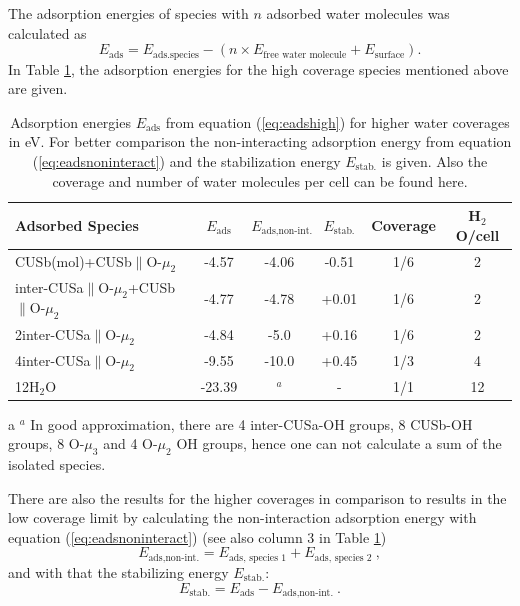 \documentclass[11pt,DIV=13,BCOR=5mm,a4paper,headinclude]{scrbook}
\begin{document}
The adsorption energies of species with $n$ adsorbed water molecules was calculated as
\begin{equation}\label{eq:eadshigh}
 E_\textrm{ads}=E_\textrm{ads.species}-(n\times E_\text{free water molecule}+E_\text{surface}).
\end{equation}
In Table \ref{tab:higher_water}, the adsorption energies for the high coverage species mentioned above are given.
\begin{table}[!ht]
  \centering
 \caption{Adsorption energies $E_\textrm{ads}$ from equation (\ref{eq:eadshigh}) for higher water coverages in eV.
For better comparison the non-interacting adsorption energy from equation (\ref{eq:eadsnoninteract}) and the stabilization energy $E_\textrm{stab.}$ is given.
Also the coverage and number of water molecules per cell can be found here.
\vspace*{.2cm} 
  }
  \begin{tabular}{lccccc}
  \toprule
  Adsorbed Species  & $E_\textrm{ads}$ & $E_\textrm{ads,non-int.}$& $E_\textrm{stab.}$& Coverage &H$_2$O/cell\\\midrule
   CUSb(mol)+CUSb$\parallel$O-$\mu_2$ & -4.57 & -4.06&-0.51&1/6&2\\
   inter-CUSa$\parallel$O-$\mu_2$+CUSb$\parallel$O-$\mu_2$ & -4.77 & -4.78&+0.01&1/6&2\\
   2inter-CUSa$\parallel$O-$\mu_2$& -4.84 &-5.0&+0.16&1/6&2 \\\hline
   4inter-CUSa$\parallel$O-$\mu_2$ & -9.55 & -10.0&+0.45&1/3&4\\\hline
   12H$_2$O & -23.39& $^a$\tnote{a} &-&1/1& 12\\\bottomrule
  \end{tabular}
  \label{tab:higher_water}
  \begin{tablenotes}\footnotesize 
    \item[a] $^a$ In good approximation, there are 4 inter-CUSa-OH groups, 8 CUSb-OH groups, 8 O-$\mu_3$ and 4 O-$\mu_2$ OH groups, hence one can not calculate a sum of the isolated species.
  \end{tablenotes}
\end{table}
There are also the results for the higher coverages in comparison to results in the low coverage limit by calculating the non-interaction adsorption energy with equation (\ref{eq:eadsnoninteract}) (see also column 3 in Table \ref{tab:higher_water})
\begin{equation}\label{eq:eadsnoninteract}
 E_\textrm{ads,non-int.}=E_\textrm{ads, species 1} + E_\textrm{ads, species 2}~,
\end{equation}
and with that the stabilizing energy $E_\textrm{stab.}$:
\begin{equation}\label{eq:stab}
 E_\textrm{stab.}=E_\textrm{ads}-E_\textrm{ads,non-int.}~.
\end{equation}
\end{document}
